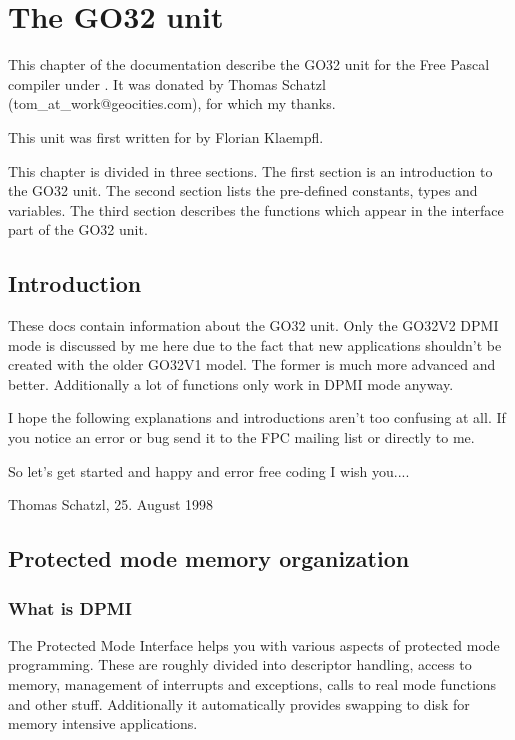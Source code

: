 \chapter{The GO32 unit}

This chapter of the documentation describe the GO32 unit for the Free Pascal
compiler under \dos. It was donated by Thomas Schatzl
(tom\_at\_work@geocities.com), for which my thanks.

This unit was first written for \dos by Florian Klaempfl.

This chapter is divided in three sections. The first section is an
introduction to the GO32 unit. The second section lists the pre-defined
constants, types and variables. The third section describes the functions
which appear in the interface part of the GO32 unit.


\section{Introduction}

These docs contain information about the GO32 unit. Only the GO32V2 DPMI
mode is discussed by me here due to the fact that new applications shouldn't
be created with the older GO32V1 model. The former is much more advanced and
better. Additionally a lot of functions only work in DPMI mode anyway.

I hope the following explanations and introductions aren't too confusing at
all. If you notice an error or bug send it to the FPC mailing list or
directly to me.

So let's get started and happy and error free coding I wish you....

\hfill Thomas Schatzl, 25. August 1998


\section{Protected mode memory organization}

\subsection{What is DPMI}

The \dos Protected Mode Interface helps you with various aspects of protected
mode programming. These are roughly divided into descriptor handling, access
to \dos memory, management of interrupts and exceptions, calls to real mode
functions and other stuff. Additionally it automatically provides swapping
to disk for memory intensive applications.

